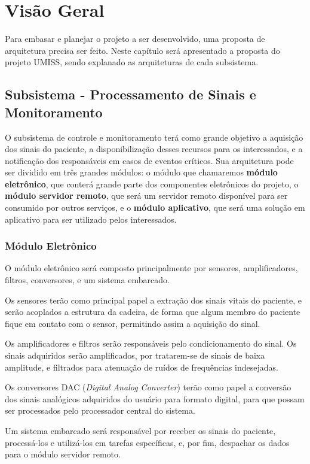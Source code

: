 \chapter{Visão Geral}

Para embasar e planejar o projeto a ser desenvolvido, uma proposta de
arquitetura precisa ser feito. Neste capítulo será apresentado a proposta do projeto UMISS,
sendo explanado as arquiteturas de cada subsistema.

\section{Subsistema - Processamento de Sinais e Monitoramento}

O subsistema de controle e monitoramento terá como grande objetivo a aquisição
dos sinais do paciente, a disponibilização desses recursos para os
interessados, e a notificação dos responsáveis em casos de eventos críticos.
Sua arquitetura pode ser dividido em três grandes
módulos: o módulo que chamaremos \textbf{módulo eletrônico}, que conterá
grande parte dos componentes eletrônicos do projeto,
o \textbf{módulo servidor remoto}, que será um servidor remoto disponível
para ser consumido por outros serviços, e o \textbf{módulo aplicativo},
que será uma solução em aplicativo para ser utilizado pelos interessados.

\subsection{Módulo Eletrônico}
O módulo eletrônico será composto principalmente por sensores, amplificadores,
filtros, conversores, e um sistema embarcado.

Os sensores terão como principal papel a extração dos sinais vitais do
paciente, e serão acoplados a estrutura da cadeira, de forma que algum
membro do paciente fique em contato com o sensor, permitindo assim a
aquisição do sinal.

Os amplificadores e filtros serão responsáveis pelo condicionamento do sinal. 
Os sinais adquiridos serão amplificados, por tratarem-se de sinais de baixa 
amplitude, e filtrados para atenuação de ruídos de frequências indesejadas.

Os conversores DAC (\textit{Digital Analog Converter}) terão como papel a conversão 
dos sinais analógicos adquiridos do usuário para formato digital, para que
possam ser processados pelo processador central do sistema.

Um sistema embarcado será responsável por receber os sinais do paciente,
processá-los e utilizá-los em tarefas específicas, e, por fim, despachar os
dados para o módulo servidor remoto.

